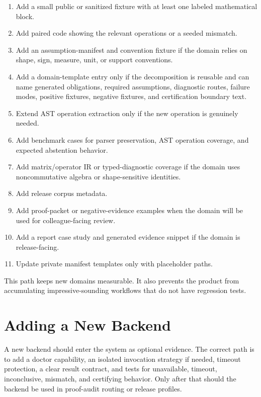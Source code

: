 \documentclass[12pt,a4paper,openany]{book}
\begin{document}
\begin{enumerate}[label=\arabic*.]
  \item Add a small public or sanitized fixture with at least one labeled
        mathematical block.
  \item Add paired code showing the relevant operations or a seeded mismatch.
  \item Add an assumption-manifest and convention fixture if the domain relies
        on shape, sign, measure, unit, or support conventions.
  \item Add a domain-template entry only if the decomposition is reusable and
        can name generated obligations, required assumptions, diagnostic routes,
        failure modes, positive fixtures, negative fixtures, and certification
        boundary text.
  \item Extend AST operation extraction only if the new operation is genuinely
        needed.
  \item Add benchmark cases for parser preservation, AST operation coverage,
        and expected abstention behavior.
  \item Add matrix/operator IR or typed-diagnostic coverage if the domain uses
        noncommutative algebra or shape-sensitive identities.
  \item Add release corpus metadata.
  \item Add proof-packet or negative-evidence examples when the domain will be
        used for colleague-facing review.
  \item Add a report case study and generated evidence snippet if the domain is
        release-facing.
  \item Update private manifest templates only with placeholder paths.
\end{enumerate}

This path keeps new domains measurable. It also prevents the product from
accumulating impressive-sounding workflows that do not have regression tests.

\chapter{Adding a New Backend}

A new backend should enter the system as optional evidence. The correct path is
to add a doctor capability, an isolated invocation strategy if needed, timeout
protection, a clear result contract, and tests for unavailable, timeout,
inconclusive, mismatch, and certifying behavior. Only after that should the
backend be used in proof-audit routing or release profiles.
\end{document}

